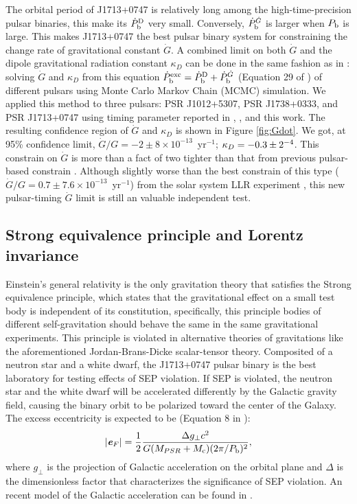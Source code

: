 The orbital period of J1713+0747 is relatively long among the
high-time-precision pulsar binaries, this make its $\dot{P}_{\rm b}^{\rm D}$
very small. Conversely, $\dot{P}_{\rm b}^{\dot{G}}$ is larger when $P_{\rm b}$
is large. This makes J1713+0747 the best pulsar binary system for constraining
the change rate of gravitational constant $\dot{G}$. A combined limit on both
$\dot{G}$ and the dipole gravitational radiation constant $\kappa_D$ can be
done in the same fashion as in \citet{lwj+09}: solving $\dot{G}$ and $\kappa_D$
from this equation $\dot{P}_{\rm b}^{\rm exc} = \dot{P}_{\rm b}^{\rm D} +
\dot{P}_{\rm b}^{\dot{G}}$ (Equation 29 of \citealt{lwj+09}) of different
pulsars using Monte Carlo Markov Chain (MCMC) simulation. We applied this method to three pulsars: PSR J1012+5307, PSR
J1738+0333, and PSR J1713+0747 using timing parameter reported in
\citet{lwj+09}, \citet{fwe+12}, and this work.
The resulting confidence region of $\dot{G}$ and $\kappa_D$ is shown in Figure
\ref{fig:Gdot}.
We got, at 95\% confidence limit, $\dot{G}/G = -2\pm8\times10^{-13}$~yr$^{-1}$;
$\kappa_D=-0.3\pm2\time10^{-4}$. 
This constrain on $\dot{G}$ is more than a fact of two tighter than that from
previous pulsar-based constrain \citep{fwe+12}. 
Although slightly worse than
the best constrain of this type
($\dot{G}/G=0.7\pm7.6\times10^{-13}$~yr$^{-1}$) from the solar system LLR
experiment \citep{hmb10}, this new pulsar-timing  $\dot{G}$ limit is still an valuable independent test.  

\subsection{Strong equivalence principle and Lorentz invariance}
\label{sec:sep}
Einstein's general relativity is the only gravitation theory that satisfies
the Strong equivalence principle, which states that the gravitational
effect on a small test body is independent of its constitution, specifically,
this principle bodies of different self-gravitation should behave the same in
the same gravitational experiments. This principle is violated in alternative
theories of gravitations like the aforementioned Jordan-Brans-Dicke
scalar-tensor theory. Composited of a neutron star and a
white dwarf, the J1713+0747 pulsar binary is the best laboratory for testing 
effects of SEP violation. If SEP is violated, the neutron star and the white
dwarf will be accelerated differently by the Galactic gravity field, causing
the binary orbit to be polarized toward the center of the Galaxy. The excess 
eccentricity is expected to be (Equation 8 in \citealt{sns+05}):
\begin{equation}
|\textbf{\textit{e}}_F| = \frac{1}{2}\frac{\Delta g_{\bot} c^2}{G(M_{PSR}+M_{\rm
c})(2\pi/P_{\rm b})^2},
\end{equation}
where $g_{\bot}$ is the projection of Galactic acceleration on the orbital plane 
and $\Delta$ is the dimensionless factor that characterizes the significance 
of SEP violation. An recent model of the Galactic acceleration can be found in
\citealt{hf04a}.

